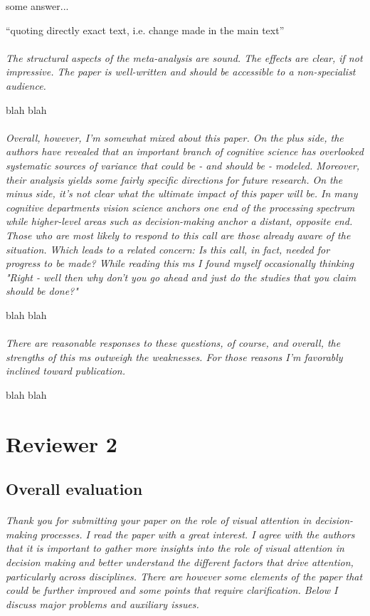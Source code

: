 \documentclass[english,natbib,man,floatsintext]{apa6}
\newcommand\eatpunct[1]{}
\newcommand{\com}[2][]{\vspace{5mm}\paragraph[ ]{ \eatpunct}\label{#1}\emph{#2}\vspace{5mm}}
\newcommand{\quotetext}[1]{\vspace{2mm}\noindent \hangindent=-2cm \hangafter=0 ``#1''\vspace{2mm}}
\begin{document}
some answer...

\quotetext{quoting directly exact text, i.e. change made in the main text} 


\com[com-r1-XX]{The structural aspects of the meta-analysis are sound. The effects are clear, if not impressive. The paper is well-written and should be accessible to a non-specialist audience.}

blah blah


\com[com-r1-XX]{Overall, however, I'm somewhat mixed about this paper. On the plus side, the authors have revealed that an important branch of cognitive science has overlooked systematic sources of variance that could be - and should be - modeled. Moreover, their analysis yields some fairly specific directions for future research. On the minus side, it's not clear what the ultimate impact of this paper will be. In many cognitive departments vision science anchors one end of the processing spectrum while higher-level areas such as decision-making anchor a distant, opposite end. Those who are most likely to respond to this call are those already aware of the situation. Which leads to a related concern: Is this call, in fact, needed for progress to be made? While reading this ms I found myself occasionally thinking "Right - well then why don't you go ahead and just do the studies that you claim should be done?"}

blah blah


\com[com-r1-XX]{There are reasonable responses to these questions, of course, and overall, the strengths of this ms outweigh the weaknesses. For those reasons I'm favorably inclined toward publication.}

blah blah




\section{Reviewer 2}
\label{rev:r2}

\subsection{Overall evaluation}
\label{rev:r2sum}

\com[com-r2-eval]{Thank you for submitting your paper on the role of visual attention in decision-making processes. I read the paper with a great interest. I agree with the authors that it is important to gather more insights into the role of visual attention in decision making and better understand the different factors that drive attention, particularly across disciplines. There are however some elements of the paper that could be further improved and some points that require clarification. Below I discuss major problems and auxiliary issues.} 
\end{document}
